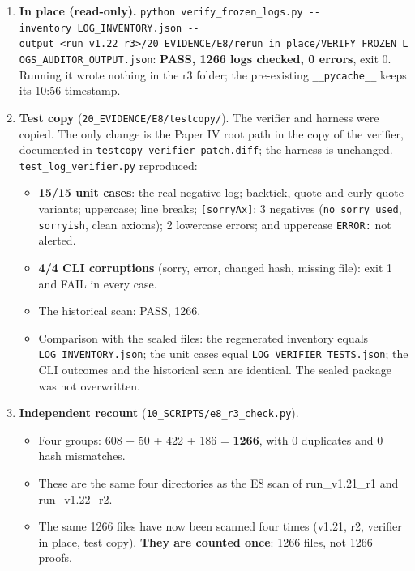 \documentclass[
]{article}
\providecommand{\tightlist}{%
  \setlength{\itemsep}{0pt}\setlength{\parskip}{0pt}}
\begin{document}
\begin{enumerate}
\def\labelenumi{\arabic{enumi}.}
\tightlist
\item
  \textbf{In place (read-only).}
  \texttt{python\ verify\_frozen\_logs.py\ -\/-inventory\ LOG\_INVENTORY.json\ -\/-output\ \textless{}run\_v1.22\_r3\textgreater{}/20\_EVIDENCE/E8/rerun\_in\_place/VERIFY\_FROZEN\_LOGS\_AUDITOR\_OUTPUT.json}:
  \textbf{PASS, 1266 logs checked, 0 errors}, exit 0. Running it wrote
  nothing in the r3 folder; the pre-existing \texttt{\_\_pycache\_\_}
  keeps its 10:56 timestamp.
\item
  \textbf{Test copy} (\texttt{20\_EVIDENCE/E8/testcopy/}). The verifier
  and harness were copied. The only change is the Paper IV root path in
  the copy of the verifier, documented in
  \texttt{testcopy\_verifier\_patch.diff}; the harness is unchanged.
  \texttt{test\_log\_verifier.py} reproduced:

  \begin{itemize}
  \tightlist
  \item
    \textbf{15/15 unit cases}: the real negative log; backtick, quote
    and curly-quote variants; uppercase; line breaks;
    \texttt{{[}sorryAx{]}}; 3 negatives (\texttt{no\_sorry\_used},
    \texttt{sorryish}, clean axioms); 2 lowercase errors; and uppercase
    \texttt{ERROR:} not alerted.
  \item
    \textbf{4/4 CLI corruptions} (sorry, error, changed hash, missing
    file): exit 1 and FAIL in every case.
  \item
    The historical scan: PASS, 1266.
  \item
    Comparison with the sealed files: the regenerated inventory equals
    \texttt{LOG\_INVENTORY.json}; the unit cases equal
    \texttt{LOG\_VERIFIER\_TESTS.json}; the CLI outcomes and the
    historical scan are identical. The sealed package was not
    overwritten.
  \end{itemize}
\item
  \textbf{Independent recount} (\texttt{10\_SCRIPTS/e8\_r3\_check.py}).

  \begin{itemize}
  \tightlist
  \item
    Four groups: 608 + 50 + 422 + 186 = \textbf{1266}, with 0 duplicates
    and 0 hash mismatches.
  \item
    These are the same four directories as the E8 scan of run\_v1.21\_r1
    and run\_v1.22\_r2.
  \item
    The same 1266 files have now been scanned four times (v1.21, r2,
    verifier in place, test copy). \textbf{They are counted once}: 1266
    files, not 1266 proofs.
  \end{itemize}
\end{enumerate}
\end{document}
